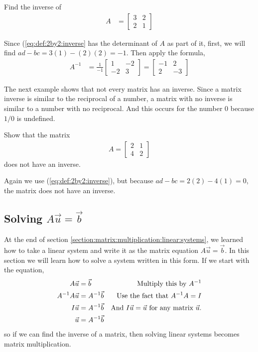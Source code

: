 \begin{example}
Find the inverse of 
%
\begin{align*}
A & = \begin{bmatrix}
3 & 2 \\ 2 & 1
\end{bmatrix}
\end{align*}
%
\solution 

Since (\ref{eq:def:2by2:inverse} has the determinant of $A$ as part of it, first, we will find $ad-bc = 3(1)-(2)(2) = -1$.  Then apply the formula,  
%
\begin{align*}
A^{-1} & = \frac{1}{-1} \begin{bmatrix}
1 & -2 \\ -2 & 3 
\end{bmatrix} = \begin{bmatrix}
-1 & 2 \\ 2 & -3
\end{bmatrix}
\end{align*}
\end{example}
The next example shows that not every matrix has an inverse.  Since a matrix inverse is similar to the reciprocal of a number, a matrix with no inverse is similar to a number with no reciprocal.  And this occurs for the number 0 because $1/0$ is undefined. 

\begin{example} \label{ex:2by2:noinverse}
Show that the matrix
%
\begin{align*}
A = \begin{bmatrix}
2 & 1 \\ 4 & 2
\end{bmatrix}
\end{align*}
does not have an inverse.

\solution

Again we use (\ref{eq:def:2by2:inverse}), but because $ad-bc = 2(2)-4(1) = 0$,  the matrix does not have an inverse.  
\end{example}

\subsection{Solving $A\vec{u}=\vec{b}$}

At the end of section \ref{section:matrix:multiplication:linear:systems}, we learned how to take a linear system and write it as the matrix equation $A\vec{u}=\vec{b}$.  In this section we will learn how to solve a system written in this form. If we start with the equation, 
%
\begin{align*}
A\vec{u} & =\vec{b}  & \text{Multiply this by $A^{-1}$} \\
A^{-1} A \vec{u}& = A^{-1} \vec{b} & \text{Use the fact that $A^{-1}A=I$} \\
I \vec{u} &  = A^{-1} \vec{b} & \text{And $I\vec{u}=\vec{u}$ for any matrix $ \vec{u}$.} \\
\vec{u} &= A^{-1}\vec{b}
\end{align*}
%
so if we can find the inverse of a matrix, then solving linear systems becomes matrix multiplication. 

